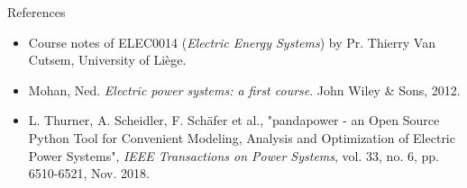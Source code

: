 \begin{frame}{References}
  \begin{itemize}
    \item Course notes of ELEC0014 (\textit{Electric Energy Systems}) by Pr. Thierry Van Cutsem, University of Liège.
    \item Mohan, Ned. \textit{Electric power systems: a first course}. John Wiley \& Sons, 2012.
    \item L. Thurner, A. Scheidler, F. Schäfer et al., "pandapower - an Open Source Python Tool for Convenient Modeling, Analysis and Optimization of Electric Power Systems", \textit{IEEE Transactions on Power Systems}, vol. 33, no. 6, pp. 6510-6521, Nov. 2018.
  \end{itemize}
\end{frame}
